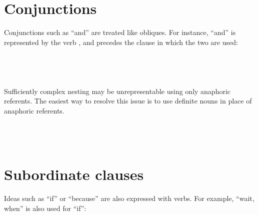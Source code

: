 \documentclass{book}
\begin{document}
\section{Conjunctions}

\label{sec:conjunctions}

Conjunctions such as ``and'' are treated like obliques. For instance, ``and'' is represented by the verb , and precedes the clause in which the two are used: \\
~\\
 \\
     \\
     \\

Sufficiently complex nesting may be unrepresentable using only anaphoric referents. The easiest way to resolve this issue is to use definite nouns in place of anaphoric referents. \\
~\\
 \\
         \\
\hlviii{[They,]}       

\section{Subordinate clauses}

Ideas such as ``if'' or ``because'' are also expressed with verbs. For example,  ``wait, when'' is also used for ``if'': \\
~\\
 \\
     \\
    \\
\end{document}
